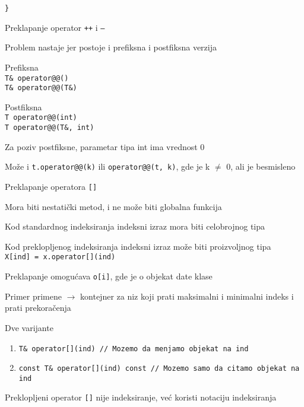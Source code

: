 \documentclass{article}
\newenvironment{xitemize}{%
    
    \itemize
    \larger
}{%
    \enditemize
}
\let\olditemize\itemize
\let\endolditemize\enditemize
\renewenvironment{itemize}{%
    \smaller
    \olditemize
}{%
    \endolditemize
}
\providecommand{\inlinecode}[1]{\texttt{#1}}
\begin{document}
\begin{xitemize}
\begin{itemize}
\begin{lstlisting}
}
    \end{lstlisting}
\end{itemize}
\item Preklapanje operator \inlinecode{++} i \inlinecode{--}
\begin{itemize}
    \item Problem nastaje jer postoje i prefiksna i postfiksna verzija
    \begin{multicols}{2}
    \item Prefiksna\\
    \inlinecode{T\& operator@@()}\\
    \inlinecode{T\& operator@@(T\&)}
    \columnbreak
    \item Postfiksna\\
    \inlinecode{T operator@@(int)}\\
    \inlinecode{T operator@@(T\&, int)}
    \end{multicols}
    \item Za poziv postfiksne, parametar tipa int ima vrednost 0
    \item Može i \inlinecode{t.operator@@(k)} ili \inlinecode{operator@@(t, k)}, gde je k $\neq$ 0, ali je besmisleno
\end{itemize}
\item Preklapanje operatora \inlinecode{[]}
\begin{itemize}
    \item Mora biti nestatički metod, i ne može biti globalna funkcija
    \item Kod standardnog indeksiranja indeksni izraz mora biti celobrojnog tipa
    \item Kod preklopljenog indeksiranja indeksni izraz može biti proizvoljnog tipa\\
    \inlinecode{X[ind] = x.operator[](ind)}
    \item Preklapanje omogućava \inlinecode{o[i]}, gde je o objekat date klase
    \item Primer primene $\rightarrow$ kontejner za niz koji prati maksimalni i minimalni indeks i prati prekoračenja
    \item Dve varijante
    \begin{enumerate}
        \item \inlinecode{T\& operator[](ind) // Mozemo da menjamo objekat na ind}
        \item \inlinecode{const T\& operator[](ind) const // Mozemo samo da citamo objekat na ind}
    \end{enumerate}
    \item Preklopljeni operator \inlinecode{[]} nije indeksiranje, već koristi notaciju indeksiranja

\end{itemize}
\end{xitemize}
\end{document}
